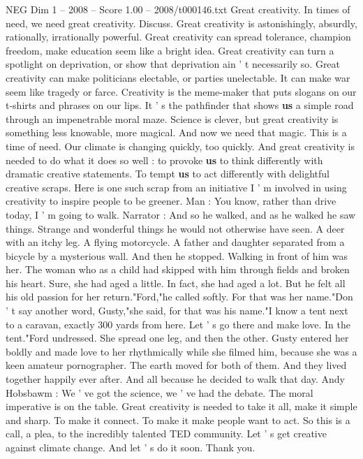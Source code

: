 \begin{textsample}{NEG Dim 1 – 2008 – Score 1.00 – 2008/t000146.txt}  \label{ex:f1_neg_071}
Great creativity.
In times of need, we need great creativity.
Discuss.
Great creativity is astonishingly, absurdly, rationally, irrationally powerful.
Great creativity can spread tolerance, champion freedom, make education seem like a bright idea.
Great creativity can turn a spotlight on deprivation, or show that deprivation ain ' t necessarily so.
Great creativity can make politicians electable, or parties unelectable.
It can make war seem like tragedy or farce.
Creativity is the meme-maker that puts slogans on our t-shirts and phrases on our lips.
It ' s the pathfinder that shows \textbf{us} a simple road through an impenetrable moral maze.
Science is clever, but great creativity is something less knowable, more magical.
And now we need that magic.
This is a time of need.
Our climate is changing quickly, too quickly.
And great creativity is needed to do what it does so well : to provoke \textbf{us} to think differently with dramatic creative statements.
To tempt \textbf{us} to act differently with delightful creative scraps.
Here is one such scrap from an initiative I ' m involved in using creativity to inspire people to be greener.
Man : You know, rather than drive today, I ' m going to walk.
Narrator : And so he walked, and as he walked he saw things.
Strange and wonderful things he would not otherwise have seen.
A deer with an itchy leg.
A flying motorcycle.
A father and daughter separated from a bicycle by a mysterious wall.
And then he stopped.
Walking in front of him was her.
The woman who as a child had skipped with him through fields and broken his heart.
Sure, she had aged a little.
In fact, she had aged a lot.
But he felt all his old passion for her return."Ford,"he called softly.
For that was her name."Don ' t say another word, Gusty,"she said, for that was his name."I know a tent next to a caravan, exactly 300 yards from here.
Let ' s go there and make love.
In the tent."Ford undressed.
She spread one leg, and then the other.
Gusty entered her boldly and made love to her rhythmically while she filmed him, because she was a keen amateur pornographer.
The earth moved for both of them.
And they lived together happily ever after.
And all because he decided to walk that day.
Andy Hobsbawm : We ' ve got the science, we ' ve had the debate.
The moral imperative is on the table.
Great creativity is needed to take it all, make it simple and sharp.
To make it connect.
To make it make people want to act.
So this is a call, a plea, to the incredibly talented TED community.
Let ' s get creative against climate change.
And let ' s do it soon.
Thank you.

\end{textsample}
